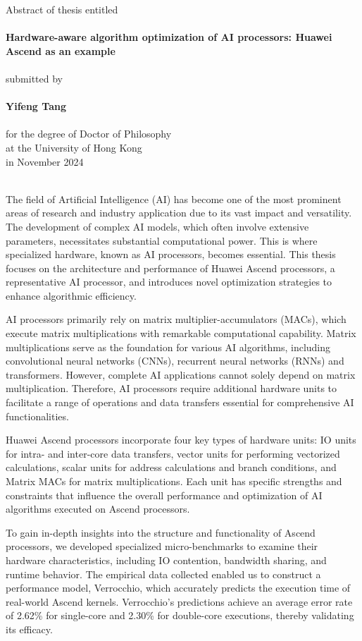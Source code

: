 \centering
Abstract of thesis entitled\\
~\\
{\Large \bf 
    Hardware-aware algorithm optimization of AI processors: Huawei Ascend as an example
}\\
~\\
submitted by\\
~\\
{\Large \bf Yifeng Tang}\\
~\\
for the degree of Doctor of Philosophy\\
at the University of Hong Kong\\
in November 2024\\
~\\
\justifying

The field of Artificial Intelligence (AI) has become one of the most prominent areas of research and industry application due to its vast impact and versatility. The development of complex AI models, which often involve extensive parameters, necessitates substantial computational power. This is where specialized hardware, known as AI processors, becomes essential. This thesis focuses on the architecture and performance of Huawei Ascend processors, a representative AI processor, and introduces novel optimization strategies to enhance algorithmic efficiency.

AI processors primarily rely on matrix multiplier-accumulators (MACs), which execute matrix multiplications with remarkable computational capability. Matrix multiplications serve as the foundation for various AI algorithms, including convolutional neural networks (CNNs), recurrent neural networks (RNNs) and transformers. However, complete AI applications cannot solely depend on matrix multiplication. Therefore, AI processors require additional hardware units to facilitate a range of operations and data transfers essential for comprehensive AI functionalities.

Huawei Ascend processors incorporate four key types of hardware units: IO units for intra- and inter-core data transfers, vector units for performing vectorized calculations, scalar units for address calculations and branch conditions, and Matrix MACs for matrix multiplications. Each unit has specific strengths and constraints that influence the overall performance and optimization of AI algorithms executed on Ascend processors.

To gain in-depth insights into the structure and functionality of Ascend processors, we developed specialized micro-benchmarks to examine their hardware characteristics, including IO contention, bandwidth sharing, and runtime behavior. The empirical data collected enabled us to construct a performance model, Verrocchio, which accurately predicts the execution time of real-world Ascend kernels. Verrocchio's predictions achieve an average error rate of 2.62\% for single-core and 2.30\% for double-core executions, thereby validating its efficacy.


